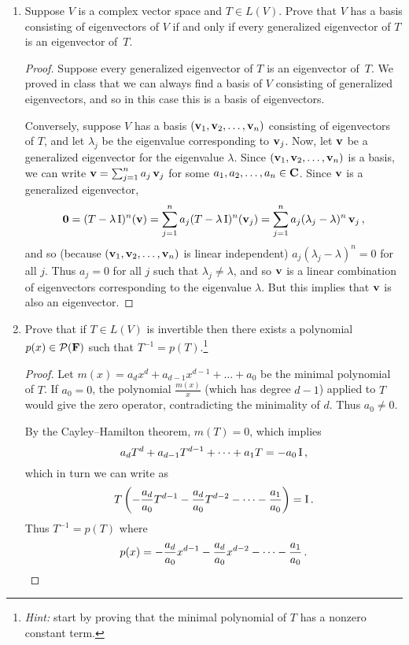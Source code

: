 \documentclass[11pt]{amsart}
\begin{document}
\begin{enumerate}[(1)]
\item Suppose $V$ is a complex vector space and $T \in L(V)$. Prove that $V$ has a basis consisting of eigenvectors of $V$ if and only if every generalized eigenvector of $T$ is an eigenvector of~$T$.

\begin{proof}
Suppose every generalized eigenvector of $T$ is an eigenvector of~$T$. We proved in class that we can always find a basis of $V$ consisting of generalized eigenvectors, and so in this case this is a basis of eigenvectors.

Conversely, suppose $V$ has a basis $\left( \mathbf v_1, \mathbf v_2, \dots, \mathbf v_n \right)$ consisting of eigenvectors of $T$, and let $\lambda_j$ be the eigenvalue corresponding to $\mathbf v_j$. Now, let $\mathbf v$ be a generalized eigenvector for the eigenvalue $\lambda$. Since $\left( \mathbf v_1, \mathbf v_2, \dots, \mathbf v_n \right)$ is a basis, we can write
$
  \mathbf v = \sum_{ j=1 }^n a_j \, \mathbf v_j
$
for some $a_1, a_2, \dots, a_n \in \mathbf{C}$. Since $\mathbf v$ is a generalized eigenvector,
\[
  \mathbf 0
  = (T - \lambda \, \mathrm I)^n (\mathbf v)
  = \sum_{ j=1 }^n a_j (T - \lambda \, \mathrm I)^n (\mathbf v_j)
  = \sum_{ j=1 }^n a_j (\lambda_j - \lambda)^n \, \mathbf v_j \, ,
\]
and so (because $\left( \mathbf v_1, \mathbf v_2, \dots, \mathbf v_n \right)$ is linear independent) $a_j (\lambda_j - \lambda)^n = 0$ for all $j$.
Thus $a_j = 0$ for all $j$ such that $\lambda_j \ne \lambda$, and so $\mathbf v$ is a linear combination of eigenvectors corresponding to the eigenvalue $\lambda$. But this implies that $\mathbf v$ is also an eigenvector.
\end{proof}

\item Prove that if $T \in L(V)$ is invertible then there exists a polynomial $p(x) \in \mathcal{P}(\mathbf{F})$ such that $T^{ -1 } = p(T)$.\footnote{\emph{Hint:} start by proving that the minimal polynomial of $T$ has a nonzero constant term.}

\begin{proof}
Let $m(x) = a_d x^d + a_{ d-1 } x^{ d-1 } + \dots + a_0$ be the minimal polynomial of $T$.
If $a_0 = 0$, the polynomial $\frac{ m(x) }{ x }$ (which has degree $d-1$) applied to $T$ would give the zero operator, contradicting the minimality of $d$. Thus $a_0 \ne 0$.

By the Cayley--Hamilton theorem, $m(T) = 0$, which implies
\[
  a_d T^d + a_{ d-1 } T^{ d-1 } + \dots + a_1 T = - a_0 \, \mathrm I \, ,
\]
which in turn we can write as
\[
  T \left( - \frac{ a_d }{ a_0 } T^{ d-1 } - \frac{ a_d }{ a_0 } T^{ d-2 } - \dots - \frac{ a_1 }{ a_0 } \right) = \mathrm I \, .
\]
Thus $T^{ -1 } = p(T)$ where
\[
  p(x) = - \frac{ a_d }{ a_0 } x^{ d-1 } - \frac{ a_d }{ a_0 } x^{ d-2 } - \dots - \frac{ a_1 }{ a_0 } \, . \qedhere
\]
\end{proof}


\end{enumerate}
\end{document}
